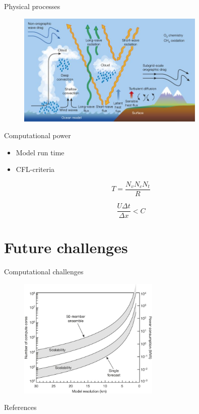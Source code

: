 \documentclass{beamer}
\begin{document}
\begin{frame}{Physical processes}
  \begin{figure}[H]
    \centering
    \includegraphics[width=0.8\textwidth]{../figures/bauer_physical.jpg}

    \parencite{bauer}
  \end{figure}
\end{frame}


\begin{frame}{Computational power}

  \begin{itemize}
    \item Model run time
    \item CFL-criteria
  \end{itemize}

  $$ T = \frac{N_v N_c N_t}{R}$$

  $$ \frac{U \Delta t}{\Delta x} < C $$

\end{frame}

\section{Future challenges}

\begin{frame}{Computational challenges}
  \begin{figure}[htp]
    \centering
    \includegraphics[width=0.6\textwidth]{../figures/bauer_cpu.jpg}

  \parencite{bauer}
  \end{figure}
\end{frame}

\begin{frame}{References}
  \printbibliography
\end{frame}
\end{document}

